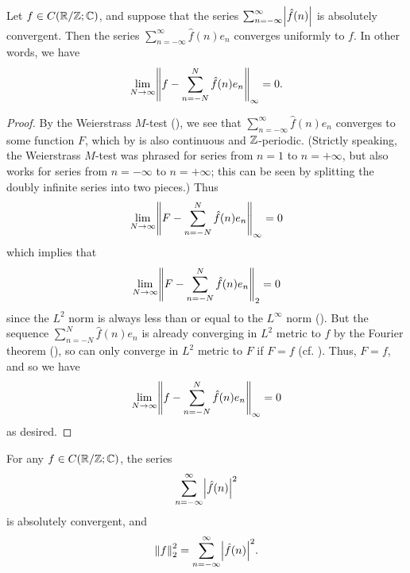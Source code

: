 \begin{thm}\label{ii:5.5.3}
  Let \(f \in C(\mathbb{R} / \mathbb{Z} ; \mathbb{C})\), and suppose that the series \(\sum_{n = -\infty}^\infty \abs{\hat{f}(n)}\) is absolutely convergent.
  Then the series \(\sum_{n = -\infty}^\infty \hat{f}(n) e_n\) converges uniformly to \(f\).
  In other words, we have
  \[
    \lim_{N \to \infty} \norm*{f - \sum_{n = -N}^N \hat{f}(n) e_n}_{\infty} = 0.
  \]
\end{thm}

\begin{proof}
  By the Weierstrass \(M\)-test (), we see that \(\sum_{n = -\infty}^\infty \hat{f}(n) e_n\) converges to some function \(F\), which by  is also continuous and \(\mathbb{Z}\)-periodic.
  (Strictly speaking, the Weierstrass \(M\)-test was phrased for series from \(n = 1\) to \(n = +\infty\), but also works for series from \(n = -\infty\) to \(n = +\infty\);
  this can be seen by splitting the doubly infinite series into two pieces.)
  Thus
  \[
    \lim_{N \to \infty} \norm*{F - \sum_{n = -N}^N \hat{f}(n) e_n}_{\infty} = 0
  \]
  which implies that
  \[
    \lim_{N \to \infty} \norm*{F - \sum_{n = -N}^N \hat{f}(n) e_n}_2 = 0
  \]
  since the \(L^2\) norm is always less than or equal to the \(L^\infty\) norm ().
  But the sequence \(\sum_{n = -N}^N \hat{f}(n) e_n\) is already converging in \(L^2\) metric to \(f\) by the Fourier theorem (), so can only converge in \(L^2\) metric to \(F\) if \(F = f\)
  (cf. ).
  Thus, \(F = f\), and so we have
  \[
    \lim_{N \to \infty} \norm*{f - \sum_{n = -N}^N \hat{f}(n) e_n}_{\infty} = 0
  \]
  as desired.
\end{proof}

\begin{thm}\label{ii:5.5.4}
  For any \(f \in C(\mathbb{R} / \mathbb{Z} ; \mathbb{C})\), the series
  \[
    \sum_{n = -\infty}^\infty \abs{\hat{f}(n)}^2
  \]
  is absolutely convergent, and
  \[
    \norm*{f}_2^2 = \sum_{n = -\infty}^\infty \abs{\hat{f}(n)}^2.
  \]
\end{thm}

